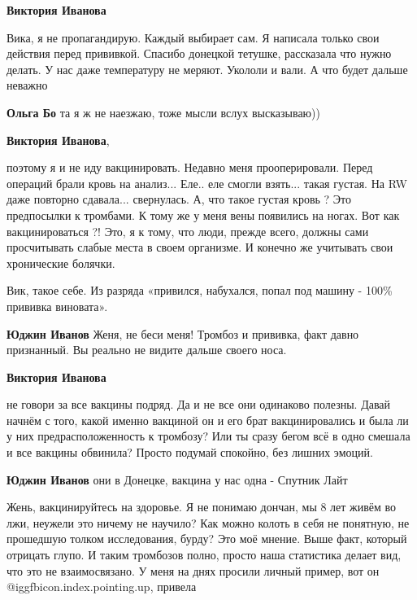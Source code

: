 \begin{itemize}
\begin{itemize}
\textbf{Виктория Иванова} 

Вика, я не пропагандирую. Каждый выбирает сам. Я написала только свои действия
перед прививкой. Спасибо донецкой тетушке, рассказала что нужно делать. У нас
даже температуру не меряют. Укололи и вали. А что будет дальше неважно

\textbf{Ольга Бо} та я ж не наезжаю, тоже мысли вслух высказываю))

\textbf{Виктория Иванова}, 

поэтому я и не иду вакцинировать. Недавно меня прооперировали. Перед операций
брали кровь на анализ... Еле.. еле смогли взять... такая густая. На RW даже
повторно сдавала... свернулась. А, что такое густая кровь ? Это предпосылки к
тромбами. К тому же у меня вены появились на ногах. Вот как вакцинироваться ?!
Это, я к тому, что люди, прежде всего, должны сами просчитывать слабые места в
своем организме. И конечно же учитывать свои хронические болячки.

\end{itemize} %


Вик, такое себе. Из разряда «привился, набухался, попал под машину - 100\%
прививка виновата».

\begin{itemize} %
\textbf{Юджин Иванов} Женя, не беси меня! Тромбоз и прививка, факт давно признанный. Вы реально не видите дальше своего носа.

\textbf{Виктория Иванова} 

не говори за все вакцины подряд. Да и не все они одинаково полезны. Давай
начнём с того, какой именно вакциной он и его брат вакцинировались и была ли у
них предрасположенность к тромбозу? Или ты сразу бегом всё в одно смешала и все
вакцины обвинила? Просто подумай спокойно, без лишних эмоций.

\textbf{Юджин Иванов} они в Донецке, вакцина у нас одна - Спутник Лайт


Жень, вакцинируйтесь на здоровье. Я не понимаю дончан, мы 8 лет живём во лжи,
неужели это ничему не научило? Как можно колоть в себя не понятную, не
прошедшую толком исследования, бурду? Это моё мнение. Выше факт, который
отрицать глупо. И таким тромбозов полно, просто наша статистика делает вид, что
это не взаимосвязано. У меня на днях просили личный пример, вот он
@igg{fbicon.index.pointing.up}, привела


\end{itemize}
\end{itemize}
